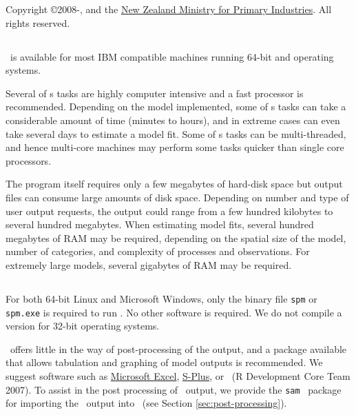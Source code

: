 Copyright \copyright 2008-\SourceControlYearDoc, \href{http://www.niwa.co.nz}{\Organisation} and the \href{http://www.mpi.govt.nz}{New Zealand Ministry for Primary Industries}. All rights reserved.

\subsection{}
\CH
\SAM\ is available for most IBM compatible machines running 64-bit  and  operating systems.

Several of \SAM s tasks are highly computer intensive and a fast processor is recommended. Depending on the model implemented, some of \SAM s tasks can take a considerable amount of time (minutes to hours), and in extreme cases can even take several days to estimate a model fit. Some of \SAM s tasks can be multi-threaded, and hence multi-core machines may perform some tasks quicker than single core processors.

The program itself requires only a few megabytes of hard-disk space but output files can consume large amounts of disk space. Depending on number and type of user output requests, the output could range from a few hundred kilobytes to several hundred megabytes. When estimating model fits, several hundred megabytes of RAM may be required, depending on the spatial size of the model, number of categories, and complexity of processes and observations. For extremely large models, several gigabytes of RAM may be required. 

\subsection{}
\CH
For both 64-bit Linux and Microsoft Windows, only the binary file \texttt{spm} or \texttt{spm.exe} is required to run \SAM . No other software is required. We do not compile a version for 32-bit operating systems. 

\SAM\ offers little in the way of  post-processing of the output, and a package available that allows tabulation and graphing of model outputs is recommended. We suggest software such as \href{http://www.microsoft.com}{Microsoft Excel}, \href{http://www.insightful.com}{S-Plus}, or \href{http://www.r-project.org}{\R}\ (R Development Core Team 2007). To assist in the post processing of \SAM\ output, we provide the \texttt{sam} \R\ package for importing the \SAM\ output into \R\ (see Section \ref{sec:post-processing}).


